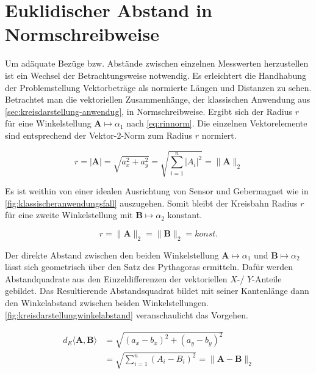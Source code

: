 %

\section{Euklidischer Abstand in Normschreibweise}\label{sec:euklidischer-abstand}


Um adäquate Bezüge bzw. Abstände zwischen einzelnen Messwerten herzustellen ist ein Wechsel der Betrachtungsweise notwendig. Es erleichtert die Handhabung der Problemstellung Vektorbeträge als normierte Längen und Distanzen zu sehen. Betrachtet man die vektoriellen Zusammenhänge, der klassischen Anwendung aus \autoref{sec:kreisdarstellung-anwendug}, in Normschreibweise. Ergibt sich der Radius $r$ für eine Winkelstellung $\mathbf{A}\mapsto\alpha_1$ nach \autoref{eq:rinnorm}. Die einzelnen Vektorelemente sind entsprechend der Vektor-2-Norm \cite{vandeGeijn2014} zum Radius $r$ normiert.


\begin{equation}\label{eq:rinnorm}
r = |\mathbf{A}| =\sqrt{a_x^2 + a_y^2} = \sqrt{\sum_{i=1}^{n}|A_i|^2} = \|\mathbf{A}\|_2
\end{equation}


Es ist weithin von einer idealen Ausrichtung von Sensor und Gebermagnet wie in \autoref{fig:klassischeranwendungsfall} auszugehen. Somit bleibt der Kreisbahn Radius $r$ für eine zweite Winkelstellung mit $\mathbf{B}\mapsto\alpha_2$ konstant.


\begin{equation}
r = \|\mathbf{A}\|_2 = \|\mathbf{B}\|_2 = konst.
\end{equation}


Der direkte Abstand zwischen den beiden Winkelstellung $\mathbf{A}\mapsto\alpha_1$ und $\mathbf{B}\mapsto\alpha_2$ lässt sich geometrisch über den Satz des Pythagoras ermitteln. Dafür werden Abstandquadrate aus den Einzeldifferenzen der vektoriellen $X$-/ $Y$-Anteile gebildet. Das Resultierende Abstandsquadrat bildet mit seiner Kantenlänge dann den Winkelabstand zwischen beiden Winkelstellungen. \autoref{fig:kreisdarstellungwinkelabstand} veranschaulicht das Vorgehen.


\begin{align}\label{eq:deinnorm}
d_E\langle\mathbf{A},\mathbf{B}\rangle &= \sqrt{(a_x - b_x)^2 + (a_y - b_y)^2} \nonumber \\
&= \sqrt{\sum_{i=1}^{n}(A_i - B_i)^2} = \|\mathbf{A} - \mathbf{B}\|_2
\end{align}


